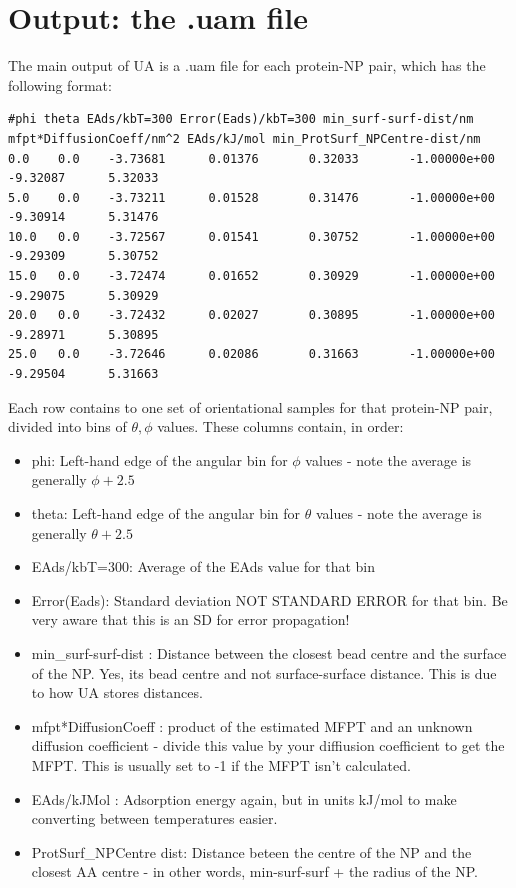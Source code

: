 \documentclass[10pt,a4paper,onecolumn]{report}
\begin{document}
\section{Output: the .uam file}
The main output of UA is a .uam file for each protein-NP pair, which has the following format:
\begin{lstlisting}
#phi theta EAds/kbT=300 Error(Eads)/kbT=300 min_surf-surf-dist/nm mfpt*DiffusionCoeff/nm^2 EAds/kJ/mol min_ProtSurf_NPCentre-dist/nm
0.0    0.0    -3.73681      0.01376       0.32033       -1.00000e+00  -9.32087      5.32033       
5.0    0.0    -3.73211      0.01528       0.31476       -1.00000e+00  -9.30914      5.31476       
10.0   0.0    -3.72567      0.01541       0.30752       -1.00000e+00  -9.29309      5.30752       
15.0   0.0    -3.72474      0.01652       0.30929       -1.00000e+00  -9.29075      5.30929       
20.0   0.0    -3.72432      0.02027       0.30895       -1.00000e+00  -9.28971      5.30895       
25.0   0.0    -3.72646      0.02086       0.31663       -1.00000e+00  -9.29504      5.31663       
\end{lstlisting}
Each row contains to one set of orientational samples for that protein-NP pair, divided into bins of $\theta,\phi$ values. These columns contain, in order:
\begin{itemize}
\item phi: Left-hand edge of the angular bin for $\phi$ values - note the average is generally $\phi + 2.5$
\item theta: Left-hand edge of the angular bin for $\theta$ values - note the average is generally $\theta + 2.5$
\item EAds/kbT=300: Average of the EAds value for that bin
\item Error(Eads): Standard deviation NOT STANDARD ERROR for that bin. Be very aware that this is an SD for error propagation! 
\item min\_surf-surf-dist : Distance between the closest bead centre and the surface of the NP. Yes, its bead centre and not surface-surface distance. This is due to how UA stores distances. 
\item mfpt*DiffusionCoeff : product of the estimated MFPT and an unknown diffusion coefficient - divide this value by your diffiusion coefficient to get the MFPT. This is usually set to -1 if the MFPT isn't calculated.
\item EAds/kJMol : Adsorption energy again, but in units kJ/mol to make converting between temperatures easier.
\item ProtSurf\_NPCentre dist: Distance beteen the centre of the NP and the closest AA centre - in other words, min-surf-surf + the radius of the NP.
\end{itemize}
 
\end{document}
